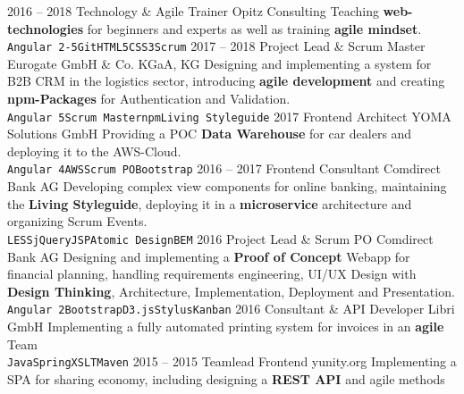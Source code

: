 \documentclass[9pt]{developercv} %
\begin{document}
\begin{entrylist}
  \entry
		{2016 -- 2018}
		{Technology \& Agile Trainer}
		{Opitz Consulting}
		{
      Teaching \textbf{web-technologies} for beginners and experts as well as training \textbf{agile mindset}.\\
      \texttt{Angular 2-5}\slashsep\texttt{Git}\slashsep\texttt{HTML5}\slashsep\texttt{CSS3}\slashsep\texttt{Scrum}
    }
  \entry
		{2017 -- 2018}
		{Project Lead \& Scrum Master}
		{Eurogate GmbH \& Co. KGaA, KG}
		{
      Designing and implementing a system for B2B CRM in the logistics sector, introducing \textbf{agile development} and 
      creating \textbf{npm-Packages} for Authentication and Validation.\\ 
      \texttt{Angular 5}\slashsep\texttt{Scrum Master}\slashsep\texttt{npm}\slashsep\texttt{Living Styleguide}
    }
  \entry
		{2017}
		{Frontend Architect}
		{YOMA Solutions GmbH}
		{
      Providing a POC \textbf{Data Warehouse} for car dealers and deploying it to the AWS-Cloud.\\
      \texttt{Angular 4}\slashsep\texttt{AWS}\slashsep\texttt{Scrum PO}\slashsep\texttt{Bootstrap}
    }
  \entry
		{2016 -- 2017}
		{Frontend Consultant}
		{Comdirect Bank AG}
		{
      Developing complex view components for online banking, maintaining the \textbf{Living Styleguide},
      deploying it in a \textbf{microservice} architecture and organizing Scrum Events.\\
      \texttt{LESS}\slashsep\texttt{jQuery}\slashsep\texttt{JSP}\slashsep\texttt{Atomic Design}\slashsep\texttt{BEM}
    }
  \entry
		{2016}
		{Project Lead \& Scrum PO}
		{Comdirect Bank AG}
		{
      Designing and implementing a \textbf{Proof of Concept} Webapp for financial planning, handling
      requirements engineering, UI/UX Design with \textbf{Design Thinking}, Architecture, Implementation, Deployment
      and Presentation.\\
      \texttt{Angular 2}\slashsep\texttt{Bootstrap}\slashsep\texttt{D3.js}\slashsep\texttt{Stylus}\slashsep\texttt{Kanban}
    }
  \entry
		{2016}
		{Consultant \& API Developer}
		{Libri GmbH}
		{
      Implementing a fully automated printing system for invoices in an \textbf{agile} Team\\
      \texttt{Java}\slashsep\texttt{Spring}\slashsep\texttt{XSLT}\slashsep\texttt{Maven}
    }
  \entry
		{2015 -- 2015}
		{Teamlead Frontend}
		{yunity.org}
		{
      Implementing a SPA for sharing economy, including designing a \textbf{REST API} and agile methods\\
}
\end{entrylist}
\end{document}
